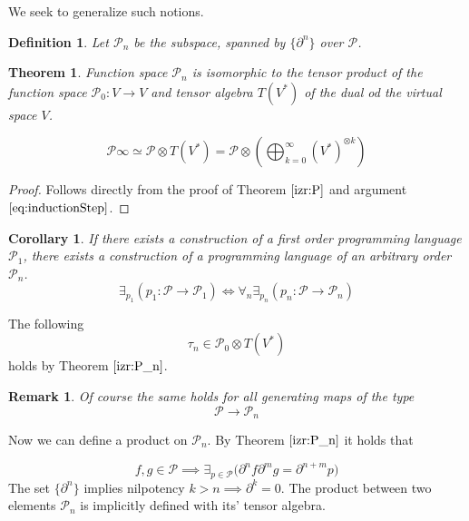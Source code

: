 \documentclass{article}
\newcommand{\dP}{\mathcal{P}}
\newcommand{\D}{\partial}
\newcommand{\sumd}{\tau}
\newtheorem{definicija}{Definition}[section]
\newtheorem{izrek}{Theorem}[section]
\newtheorem{opomba}{Remark}[section]
\newtheorem{corollary}{Corollary}[section]
\begin{document}
We seek to generalize such notions.

\begin{definicija}
Let $\dP_n$ be the subspace, spanned by $\{\partial^n\}$ over $\dP$.
 \end{definicija}
 
 \begin{izrek}\label{izr:P_n}
 	Function space $\dP_n$ is isomorphic to the tensor product of the function space $\dP_0:V\to V$ and tensor algebra $T(V^*)$ of the dual od the virtual space $V$.
 	
 	\begin{equation}
 	\label{eq:P_algebra}
 	 	    \dP\infty\simeq \dP\otimes T(V^*) = \dP \otimes\left(\bigoplus_{k=0}^\infty (V^*)^{\otimes k} \right)
 	\end{equation}
 \end{izrek}
 
 \begin{proof} Follows directly from the proof of Theorem $\ref{izr:P}$ and argument $\eqref{eq:inductionStep}$.
  \end{proof}
  \begin{corollary}
  If there exists a construction of a first order programming language $\dP_1$, there exists a construction of a programming language of an arbitrary order $\dP_n$.
  \begin{equation}
  \exists_{p_1}(p_1:\dP\to\dP_1)\iff\forall_n\exists_{p_n}(p_n:\dP\to\dP_n)
  \end{equation}
  \end{corollary}
     
    The following
     \begin{equation}
     	\sumd_n\in\dP_0\otimes T(V^*)
     \end{equation}
   	holds by Theorem $\ref{izr:P_n}$.
        \begin{opomba}
        Of course the same holds for all generating maps of the type
        $$\dP\to\dP_n$$
        \end{opomba}

Now we can define a product on $\dP_n$. By Theorem $\ref{izr:P_n}$ it holds that

\begin{equation}
	f,g\in\dP\implies\exists_{p\in\dP}\Big(\D^nf\D^mg=\D^{n+m}p\Big)
\end{equation}
The set $\{\D^n\}$ implies nilpotency $k>n\implies\D^k=0$. The product between two elements $\dP_n$ is implicitly defined with its' tensor algebra. 
\end{document}
